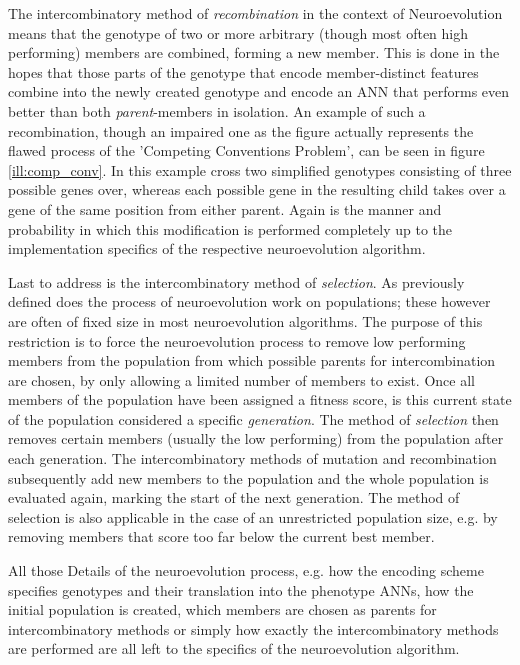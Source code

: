 \documentclass[journal, a4paper]{IEEEtran}
\begin{document}
The intercombinatory method of \textit{recombination} in the context of Neuroevolution means that the genotype of two or more arbitrary (though most often high performing) members are combined, forming a new member. This is done in the hopes that those parts of the genotype that encode member-distinct features combine into the newly created genotype and encode an ANN that performs even better than both \textit{parent}-members in isolation. An example of such a recombination, though an impaired one as the figure actually represents the flawed process of the 'Competing Conventions Problem', can be seen in figure \ref{ill:comp_conv}. In this example cross two simplified genotypes consisting of three possible genes over, whereas each possible gene in the resulting child takes over a gene of the same position from either parent. Again is the manner and probability in which this modification is performed completely up to the implementation specifics of the respective neuroevolution algorithm.

Last to address is the intercombinatory method of \textit{selection}. As previously defined does the process of neuroevolution work on populations; these however are often of fixed size in most neuroevolution algorithms. The purpose of this restriction is to force the neuroevolution process to remove low performing members from the population from which possible parents for intercombination are chosen, by only allowing a limited number of members to exist. Once all members of the population have been assigned a fitness score, is this current state of the population considered a specific \textit{generation}. The method of \textit{selection} then removes certain members (usually the low performing) from the population after each generation. The intercombinatory methods of mutation and recombination subsequently add new members to the population and the whole population is evaluated again, marking the start of the next generation. The method of selection is also applicable in the case of an unrestricted population size, e.g. by removing members that score too far below the current best member.

All those Details of the neuroevolution process, e.g. how the encoding scheme specifies genotypes and their translation into the phenotype ANNs, how the initial population is created, which members are chosen as parents for intercombinatory methods or simply how exactly the intercombinatory methods are performed are all left to the specifics of the neuroevolution algorithm.
\end{document}
